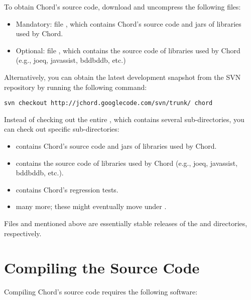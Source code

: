 To obtain Chord's source code, download and uncompress the following files:

\begin{itemize}
\item
Mandatory: file ,
which contains Chord's source code and jars of libraries used by Chord.
\item
Optional: file
, which contains the source code of libraries used
by Chord (e.g., joeq, javassist, bddbddb, etc.)
\end{itemize}

Alternatively, you can obtain the latest development snapshot from the SVN repository by running the following command:

\begin{framed}
\begin{verbatim}
svn checkout http://jchord.googlecode.com/svn/trunk/ chord
\end{verbatim}
\end{framed}

Instead of checking out the entire , which contains several sub-directories, you can check out specific sub-directories:

\begin{itemize}
\item
{} contains Chord's source code and jars of libraries used by Chord.
\item
{} contains the source code of libraries used by Chord (e.g., joeq, javassist, bddbddb, etc.).
\item
{} contains Chord's regression tests.
\item
many more; these might eventually move under .
\end{itemize}

Files  and  mentioned above are essentially stable releases of the  and
 directories, respectively.

\section{Compiling the Source Code}
\label{sec:compiling-sources}

Compiling Chord's source code requires the following software:

